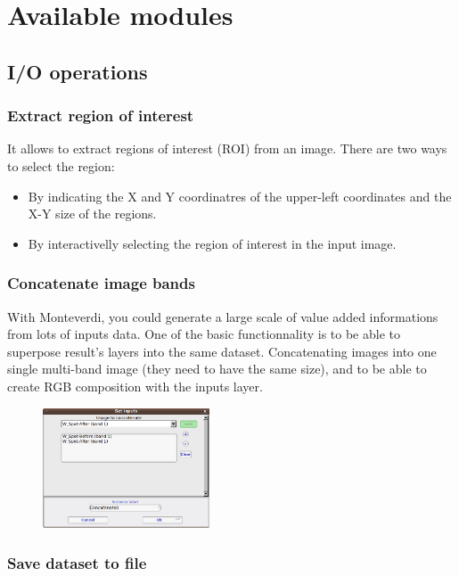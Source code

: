 \section{Available modules}\label{sec:modules} 
\subsection{I/O operations}
\subsubsection{Extract region of interest}
It allows to extract regions of interest (ROI) from an image. There are two ways to select the region:
\begin{itemize}
\item By indicating the X and Y coordinatres of the upper-left coordinates and the X-Y size of the regions.
\item By interactivelly selecting the region of interest in the input image.
\end{itemize}

\subsubsection{Concatenate image bands}
With Monteverdi, you could generate a large scale of value added informations from lots of inputs data. One of the basic
functionnality is to be able to superpose result's layers into the same dataset.  
Concatenating images into one single multi-band image (they need to have the same size), and to be able to create RGB composition 
with the inputs layer.

\begin{figure}
   \center
   \includegraphics[width=0.44\textwidth]{../Art/MonteverdiImages/monteverdi_concatenate_before_after.png}
   \label{fig:concatenate}
\end{figure}
 
\subsubsection{Save dataset to file}

